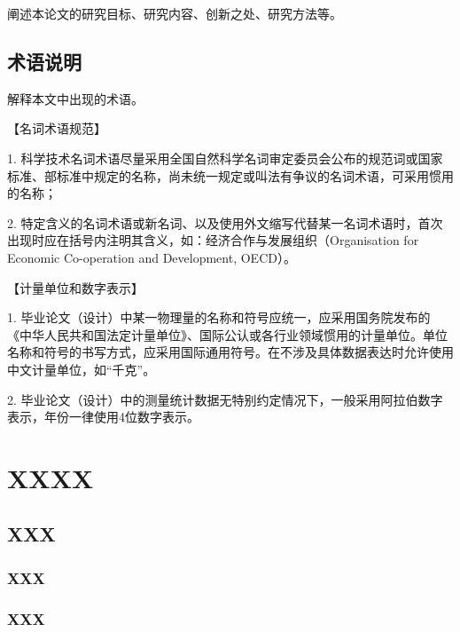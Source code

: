 \documentclass[fontset=auto]{jnuthesis}
\begin{document}
阐述本论文的研究目标、研究内容、创新之处、研究方法等。

\section{术语说明}

解释本文中出现的术语。

\vspace{\baselineskip}

【名词术语规范】

\vspace{\baselineskip}

1. 科学技术名词术语尽量采用全国自然科学名词审定委员会公布的规范词或国家标准、部标准中规定的名称，尚未统一规定或叫法有争议的名词术语，可采用惯用的名称；

2. 特定含义的名词术语或新名词、以及使用外文缩写代替某一名词术语时，首次出现时应在括号内注明其含义，如：经济合作与发展组织（Organisation for Economic Co-operation and Development, OECD）。

\vspace{\baselineskip}

【计量单位和数字表示】

\vspace{\baselineskip}

1. 毕业论文（设计）中某一物理量的名称和符号应统一，应采用国务院发布的《中华人民共和国法定计量单位》、国际公认或各行业领域惯用的计量单位。单位名称和符号的书写方式，应采用国际通用符号。在不涉及具体数据表达时允许使用中文计量单位，如“千克”。

\vspace{\baselineskip}

2. 毕业论文（设计）中的测量统计数据无特别约定情况下，一般采用阿拉伯数字表示，年份一律使用4位数字表示。

\chapter{XXXX}

\section{XXX}

\subsection{XXX}

\subsection{XXX}
\end{document}
